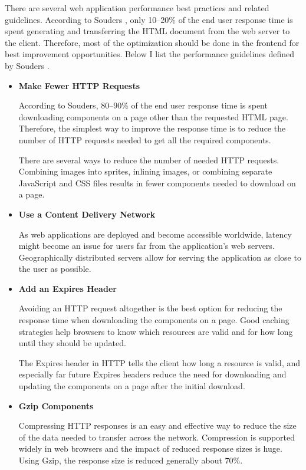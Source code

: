 There are several web application performance best practices and
related guidelines. According to Souders \cite{souders2007high}, only
10--20\% of the end user response time is spent generating and
transferring the HTML document from the web server to the
client. Therefore, most of the optimization should be done in the
frontend for best improvement opportunities. Below I list the
performance guidelines defined by Souders \cite{souders2007high}.

\begin{itemize}


\item \textbf{Make Fewer HTTP Requests}

  According to Souders, 80--90\% of the end user response time is
  spent downloading components on a page other than the requested HTML
  page. Therefore, the simplest way to improve the response time is to
  reduce the number of HTTP requests needed to get all the required
  components.

  There are several ways to reduce the number of needed HTTP
  requests. Combining images into sprites, inlining images, or
  combining separate JavaScript and CSS files results in fewer
  components needed to download on a page.

\item \textbf{Use a Content Delivery Network}

  As web applications are deployed and become accessible worldwide,
  latency might become an issue for users far from the application's
  web servers. Geographically distributed servers allow for serving
  the application as close to the user as possible.

\item \textbf{Add an Expires Header}

  Avoiding an HTTP request altogether is the best option for reducing
  the response time when downloading the components on a page. Good
  caching strategies help browsers to know which resources are valid
  and for how long until they should be updated.

  The Expires header in HTTP tells the client how long a resource is
  valid, and especially far future Expires headers reduce the need for
  downloading and updating the components on a page after the initial
  download.

\item \textbf{Gzip Components}

  Compressing HTTP responses is an easy and effective way to reduce
  the size of the data needed to transfer across the
  network. Compression is supported widely in web browsers and the
  impact of reduced response sizes is huge. Using Gzip, the response
  size is reduced generally about 70\%.


\end{itemize}
